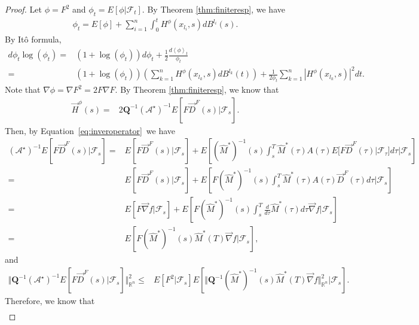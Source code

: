 \documentclass[11pt]{article}
\numberwithin{equation}{section}%
\numberwithin{figure}{section}%
\theoremstyle{remark}
\begin{document}
	\begin{proof}
		Let $\phi=F^{2}$ and $\phi_{t}=E[\phi|\mathcal{F}_{t}]$. By Theorem \ref{thm:finiteresp}, we have
		\begin{align*}
			\phi_{t}=E[\phi]+\sum_{i=1}^{n}\int_{0}^{t}  H^{\phi}(x_{l_{i}},s)dB^{l_{i}}(s).
		\end{align*} 
		By It\^{o} formula,
		\begin{equation}\label{eq:ito}
			\begin{split}
				d\phi_{t}\log(\phi_{t})=&(1+\log(\phi_{t}))d\phi_{t}+\frac{1}{2}\frac{d\left \langle \phi \right \rangle_{t}}{\phi_{t}}\\
				=&(1+\log(\phi_{t}))\left(\sum_{k=1}^{n} H^{\phi}(x_{l_{k}},s)dB^{l_{k}}(t)\right)+\frac{1}{2\phi_{t}}\sum_{k=1}^{n}|H^{\phi}(x_{l_{k}},s)|^{2}dt.
			\end{split}
		\end{equation}
		Note that $\nabla\phi=\nabla F^{2}=2F\nabla F$. By Theorem \ref{thm:finiteresp}, we know that
		\begin{align*}
			\vec{H}^{\phi}(s)
			=&2\mathbf{Q}^{-1}(\mathcal{A}^{\star})^{-1} E[F\vec{D}^{F}(s)|\mathcal{F}_{s}].
		\end{align*}
		Then, by Equation~\eqref{eq:inveroperator}~we have
		\begin{align*}
			(\mathcal{A}^{\star})^{-1}E[F\vec{D}^{F}(s)|\mathcal{F}_{s}] =&E[F\vec{D}^{F}(s)|\mathcal{F}_{s}]+E\left[(\hat{M}^{*})^{-1}(s)\int_{s}^{T}\hat{M}^{*}(\tau)A(\tau)E[F\vec{D}^{F}(\tau)|\mathcal{F}_{\tau}]d\tau|\mathcal{F}_{s}\right]\\
			=&E[F\vec{D}^{F}(s)|\mathcal{F}_{s}]+E\left[F(\hat{M}^{*})^{-1}(s)\int_{s}^{T}\hat{M}^{*}(\tau)A(\tau)\vec{D}^{F}(\tau)d\tau|\mathcal{F}_{s}\right]\\
			=&E[F\vec{\nabla}f|\mathcal{F}_{s}]+E\left[F(\hat{M}^{*})^{-1}(s)\int_{s}^{T}\frac{d}{d\tau}\hat{M}^{*}(\tau)d\tau\vec{\nabla}f|\mathcal{F}_{s}\right]\\
			=&E\left[F(\hat{M}^{*})^{-1}(s)\hat{M}^{*}(T)\vec{\nabla}f|\mathcal{F}_{s}\right],
		\end{align*}
		and
		\begin{align*}
			\Vert\mathbf{Q}^{-1}(\mathcal{A}^{\star})^{-1}E[F\vec{D}^{F}(s)|\mathcal{F}_{s}]\Vert^{2}_{\mathbb{R}^{n}} 
			\leq&E[F^{2}|\mathcal{F}_{s}]E\left[\Vert\mathbf{Q}^{-1}(\hat{M}^{*})^{-1}(s)\hat{M}^{*}(T)\vec{\nabla}f\Vert^{2}_{\mathbb{R}^{n}}|\mathcal{F}_{s}\right].
		\end{align*}
		Therefore, we know that
		\begin{align*}

\end{align*}
\end{proof}
\end{document}
